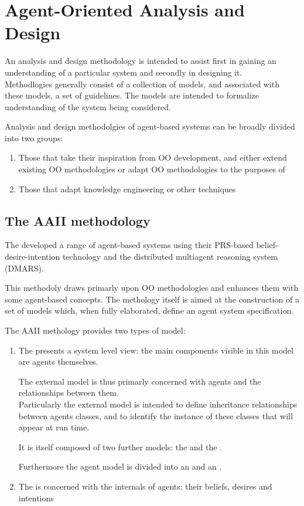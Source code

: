 \section{Agent-Oriented Analysis and Design}
An analysis and design methodology is intended to assist first in gaining an understanding of a particular system and secondly in designing it.\\
Methodlogies generally consist of a collection of models, and associated with these models, a set of guidelines. The models are intended to formalize understanding of the system being considered.

Analysis and design methodolgies of agent-based systems can be broadly divided into two groups:
\begin{enumerate}
\item Those that take their inspiration from OO development, and either extend existing OO methodologies or adapt OO methodologies to the purposes of 
\item Those that adapt knowledge engineering or other techniques
\end{enumerate}
\subsection{The AAII methodology}
The  developed a range of agent-based systems using their PRS-based belief-desire-intention technology and the distributed  multiagent reasoning system (DMARS).

This methodoly draws primarly upon OO methodologies and enhances them with some agent-based concepts. The methology itself is aimed at the construction of a set of models which, when fully elaborated, define an agent system specification.

The AAII methology provides two types of model:
\begin{enumerate}
\item The  presents a system level view: the main components visible in this model are agents themselves.

The external model is thus primarly concerned with agents and the relationships between them.\\
Particularly the external model is intended to define inheritance relationships between agents classes, and to identify the instance of these classes that will appear at run time.

It is itself composed of two further models: the  and the .

Furthermore the agent model is divided into an  and an . 

\item The  is concerned with the internals of agents: their beliefs, desires and intentions
\end{enumerate}

